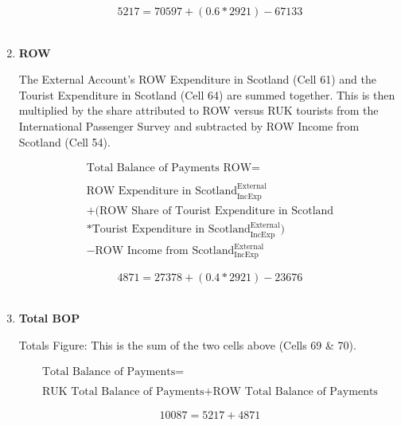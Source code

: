 \begin{enumerate}
\begin{equation} \nonumber
5217 = 70597+(0.6*2921)-67133
\end{equation}\\


\item \textbf {ROW}

The External Account's ROW Expenditure in Scotland (Cell 61) and the Tourist Expenditure in Scotland (Cell 64) are summed together. This is then multiplied by the share attributed to ROW versus RUK tourists from the International Passenger Survey \cite{ONS2010a} and subtracted by ROW Income from Scotland (Cell 54).

\begin{equation}
\begin{split}
\text{Total Balance of Payments ROW} =  \\ \\
\text{ROW Expenditure in Scotland}^\text{External}_\text{IncExp}\\
+(\text{ROW Share of Tourist Expenditure in Scotland}\\
*\text{Tourist  Expenditure in Scotland}^\text{External}_\text{IncExp})\\
-\text{ROW Income from Scotland}^\text{External}_\text{IncExp}
\end{split} \label{eq:2.5.74}
\end{equation}

\begin{equation} \nonumber
4871 = 27378+(0.4*2921)-23676
\end{equation}\\

\newpage

\item \textbf {Total BOP}

Totals Figure: This is the sum of the two cells above (Cells 69 \& 70).

\begin{equation}
\begin{split}
\text{Total Balance of Payments} =  \\ \\
\text{RUK Total Balance of Payments}+\text{ROW Total Balance of Payments}
\end{split} \label{eq:2.5.75}
\end{equation}

\begin{equation} \nonumber
10087 = 5217+4871
\end{equation}\\




\end{enumerate}
